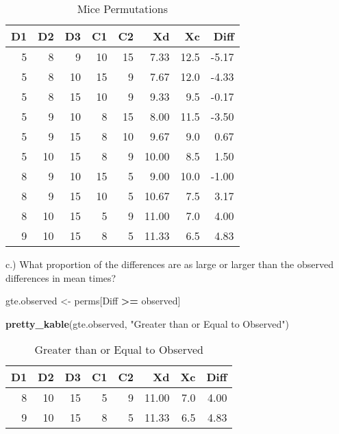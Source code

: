 \documentclass[
  12pt,
]{report}
\newenvironment{Shaded}{\begin{snugshade}}{\end{snugshade}}
\newcommand{\KeywordTok}[1]{\textcolor[rgb]{0.13,0.29,0.53}{\textbf{#1}}}
\newcommand{\NormalTok}[1]{#1}
\newcommand{\OperatorTok}[1]{\textcolor[rgb]{0.81,0.36,0.00}{\textbf{#1}}}
\newcommand{\StringTok}[1]{\textcolor[rgb]{0.31,0.60,0.02}{#1}}
\begin{document}
\newpage

\begin{table}[!h]

\caption{\label{tab:unnamed-chunk-3}Mice Permutations}
\centering
\begin{tabular}[t]{r|r|r|r|r|r|r|r}
\hline
D1 & D2 & D3 & C1 & C2 & Xd & Xc & Diff\\
\hline
5 & 8 & 9 & 10 & 15 & 7.33 & 12.5 & -5.17\\
\hline
5 & 8 & 10 & 15 & 9 & 7.67 & 12.0 & -4.33\\
\hline
5 & 8 & 15 & 10 & 9 & 9.33 & 9.5 & -0.17\\
\hline
5 & 9 & 10 & 8 & 15 & 8.00 & 11.5 & -3.50\\
\hline
5 & 9 & 15 & 8 & 10 & 9.67 & 9.0 & 0.67\\
\hline
5 & 10 & 15 & 8 & 9 & 10.00 & 8.5 & 1.50\\
\hline
8 & 9 & 10 & 15 & 5 & 9.00 & 10.0 & -1.00\\
\hline
8 & 9 & 15 & 10 & 5 & 10.67 & 7.5 & 3.17\\
\hline
8 & 10 & 15 & 5 & 9 & 11.00 & 7.0 & 4.00\\
\hline
9 & 10 & 15 & 8 & 5 & 11.33 & 6.5 & 4.83\\
\hline
\end{tabular}
\end{table}

c.) What proportion of the differences are as large or larger than the
observed differences in mean times?

\begin{Shaded}
\begin{Highlighting}[]
\NormalTok{gte.observed <-}\StringTok{ }\NormalTok{perms[Diff }\OperatorTok{>=}\StringTok{ }\NormalTok{observed]}

\KeywordTok{pretty_kable}\NormalTok{(gte.observed, }\StringTok{"Greater than or Equal to Observed"}\NormalTok{)}
\end{Highlighting}
\end{Shaded}

\begin{table}[!h]

\caption{\label{tab:unnamed-chunk-4}Greater than or Equal to Observed}
\centering
\begin{tabular}[t]{r|r|r|r|r|r|r|r}
\hline
D1 & D2 & D3 & C1 & C2 & Xd & Xc & Diff\\
\hline
8 & 10 & 15 & 5 & 9 & 11.00 & 7.0 & 4.00\\
\hline
9 & 10 & 15 & 8 & 5 & 11.33 & 6.5 & 4.83\\
\hline
\end{tabular}
\end{table}
\end{document}
